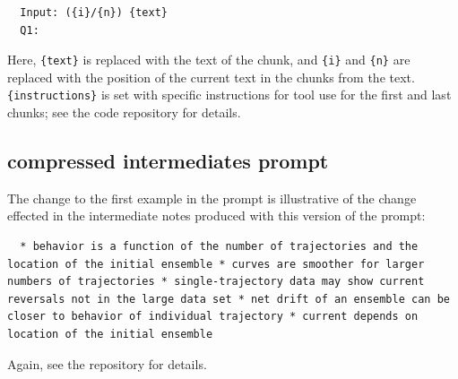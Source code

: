 \documentclass{article}
\begin{document}
\begin{lstlisting}
  Input: ({i}/{n}) {text}
  Q1:
\end{lstlisting}

Here, \texttt{\{text\}} is replaced with the text of the chunk, and \texttt{\{i\}} and \texttt{\{n\}} are replaced with the position of the current text in the chunks from the text. \texttt{\{instructions\}} is set with specific instructions for tool use for the first and last chunks; see the code repository for details.

\subsection{compressed intermediates prompt}

The change to the first example in the prompt is illustrative of the change effected in the intermediate notes produced with this version of the prompt:

\begin{lstlisting}
  * behavior is a function of the number of trajectories and the location of the initial ensemble * curves are smoother for larger numbers of trajectories * single-trajectory data may show current reversals not in the large data set * net drift of an ensemble can be closer to behavior of individual trajectory * current depends on location of the initial ensemble
\end{lstlisting}

Again, see the repository for details.
\end{document}
